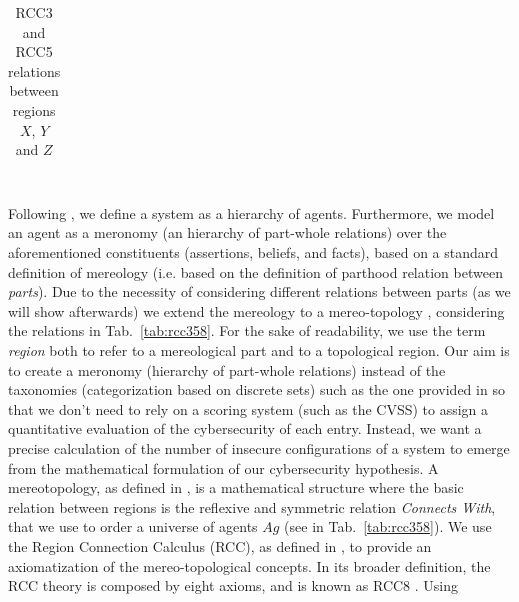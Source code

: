 \documentclass[runningheads]{llncs}
\newcommand{\Tdot}{$\CIRCLE$}
\newcommand{\agentuniverse}{Ag}
\begin{document}
\begin{table}[t]
\begin{tabular}{cclll}
\end{tabular}
\caption{RCC3 and RCC5 relations between regions $X$, $Y$ and $Z$ ~\label{tab:rcc358}~\label{tab:rcc}}
\end{table}

Following \autocite{Santaca2016abf}, we define a system as a hierarchy of agents. Furthermore, we model an agent as a meronomy (an
hierarchy of part-whole relations) over the aforementioned constituents 
(assertions, beliefs, and facts), based on a standard definition of mereology
(i.e. based on the definition of parthood relation between \emph{parts}).  Due to
the necessity of considering different relations between parts (as we will show afterwards)
we extend the mereology to a
mereo-topology \autocite{Smith1996mereotopology,Varzi1994mereotopology,Rachavelpula2017mereotopology},
considering the relations in Tab.~\ref{tab:rcc358}.  For the sake of
readability, we use the term \emph{region} both to refer to a mereological part
and to a topological region.  Our aim is to create a meronomy (hierarchy of
part-whole relations) instead of the taxonomies (categorization based on
discrete sets) such as the one provided in \autocite{NIST2020NVD,CVE}
so that we don't need to rely on a scoring system (such as the CVSS) to assign
a quantitative evaluation of the cybersecurity of each entry. Instead, we want
a precise calculation of the number of insecure configurations of a system to
emerge from the mathematical formulation of our cybersecurity hypothesis.
A mereotopology, as defined in \autocite{Rachavelpula2017mereotopology},
is a mathematical structure where the basic relation between regions
is the reflexive and symmetric relation \emph{Connects With},
that we use to order a universe of agents
$\agentuniverse$ (see in Tab.~\ref{tab:rcc358}).  We use the Region Connection
Calculus (RCC), as defined in \autocite{bennettLogics,Grutter2008rcc}, to provide
an axiomatization of the mereo-topological concepts. In its broader definition,
the RCC theory is composed by eight axioms, and is known as RCC8 \autocite{Grutter2008rcc}. Using
\end{document}
